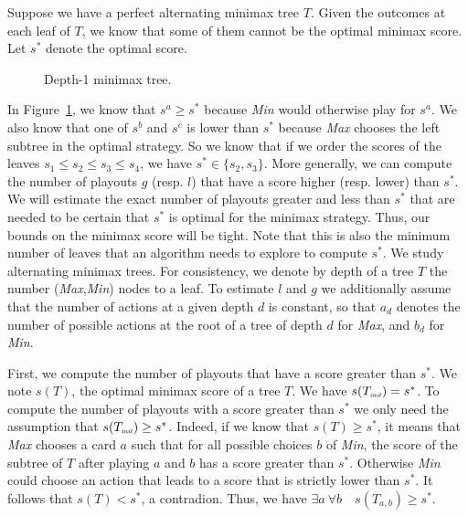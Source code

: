 \documentclass[runningheads]{llncs}
\begin{document}
Suppose we have a perfect alternating minimax tree $T$. Given the outcomes at each leaf of $T$, we know that some of them cannot be the optimal minimax score. Let $s^*$ denote the optimal score. 
%
\begin{figure}[t]
    \centering
    \caption{Depth-1 minimax tree.}
    \label{treke}
\end{figure}
%
In Figure~\ref{treke}, we know that $s^a \geq s^*$ because \emph{Min} would otherwise play for $s^a$. We also know that one of $s^b$ and $s^c$ is lower than $s^*$ because \emph{Max} chooses the left subtree in the optimal strategy. So we know that if we order the scores of the leaves $s_1 \leq s_2 \leq s_3 \leq s_4$, we have $s^* \in \{s_2, s_3\}$. More generally, we can compute the number of playouts $g$ (resp. $l$) that have a score higher (resp. lower) than $s^*$.
%
We will estimate the exact number of playouts  greater and less than $s^*$ that are needed to be certain that $s^*$ is optimal for the minimax strategy. Thus, our bounds on the minimax score will be tight. Note that this is also the minimum number of leaves that an algorithm needs to explore to compute $s^*$. 
%
We study alternating minimax trees. For consistency, we denote by depth of a tree $T$ the number (\emph{Max},\emph{Min}) nodes to a leaf. To estimate $l$ and $g$ we additionally assume that the number of actions at a given depth $d$ is constant, so that $a_d$ denotes the number of possible actions at the root of a tree of depth $d$ for \emph{Max}, and $b_d$ for \emph{Min}.

First, we compute the number of playouts that have a score greater than $s^*$. We note $s (T)$, the optimal minimax score of a tree $T$. We have  $s(T_{\mbox{\em \tiny init}}) = s^*$. To compute the number of playouts with a score greater than $s^*$ we only need the assumption that $s(T_{\mbox{\em \tiny init}}) \geq s^*$. Indeed, if we know that $s (T) \geq s^*$, it means that \emph{Max} chooses a card $a$ such that for all possible choices $b$ of \emph{Min}, the score of the subtree of $T$ after playing $a$ and $b$ has a score greater than $s^*$. Otherwise \emph{Min} could choose an action that leads to a score that is strictly lower than $s^*$. It follows that $s (T) < s^*$, a contradion. Thus, we have $\exists a ~ \forall b \quad s (T_{a,b}) \geq s^*.$ 
\end{document}
